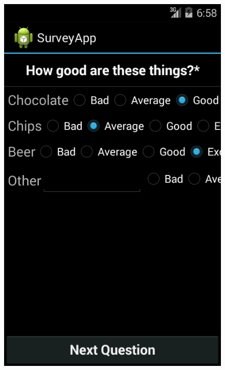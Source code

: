 \documentclass[runningheads,a4paper]{llncs}
\begin{document}
\begin{figure}[htb]
{	\includegraphics[scale=0.22]{images/android/android_4}}
	\quad
	\subfigure[Question 5]{
}
\end{figure}
\end{document}
